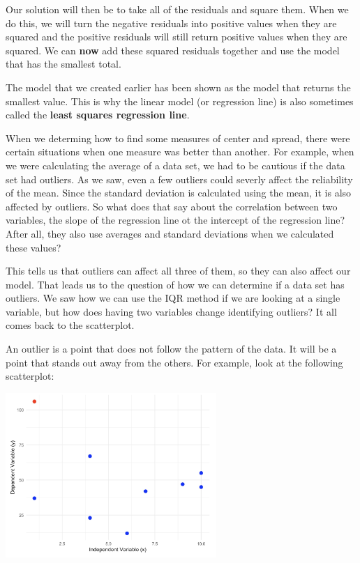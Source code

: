 \documentclass[
  letterpaper,
  DIV=11,
  numbers=noendperiod]{scrreprt}
\begin{document}
Our solution will then be to take all of the residuals and square them.
When we do this, we will turn the negative residuals into positive
values when they are squared and the positive residuals will still
return positive values when they are squared. We can \textbf{now} add
these squared residuals together and use the model that has the smallest
total.

The model that we created earlier has been shown as the model that
returns the smallest value. This is why the linear model (or regression
line) is also sometimes called the \textbf{least squares regression
line}.

When we determing how to find some measures of center and spread, there
were certain situations when one measure was better than another. For
example, when we were calculating the average of a data set, we had to
be cautious if the data set had outliers. As we saw, even a few outliers
could severly affect the reliability of the mean. Since the standard
deviation is calculated using the mean, it is also affected by outliers.
So what does that say about the correlation between two variables, the
slope of the regression line ot the intercept of the regression line?
After all, they also use averages and standard deviations when we
calculated these values?

This tells us that outliers can affect all three of them, so they can
also affect our model. That leads us to the question of how we can
determine if a data set has outliers. We saw how we can use the IQR
method if we are looking at a single variable, but how does having two
variables change identifying outliers? It all comes back to the
scatterplot.

An outlier is a point that does not follow the pattern of the data. It
will be a point that stands out away from the others. For example, look
at the following scatterplot:

\includegraphics[width=0.6\textwidth,height=\textheight]{./images/ROP_3.jpg}
\end{document}
